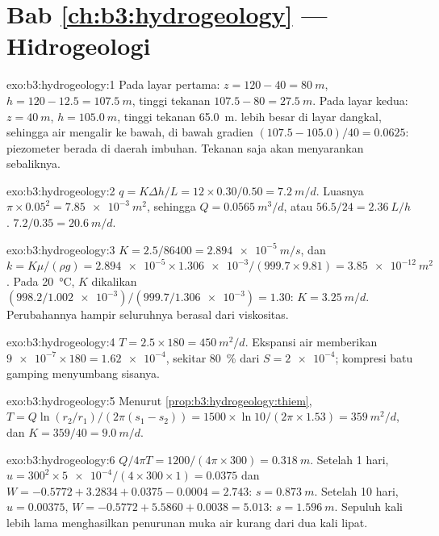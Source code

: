 \section*{Bab \ref{ch:b3:hydrogeology} --- Hidrogeologi}

\begin{solution}{exo:b3:hydrogeology:1}
Pada layar pertama: $z = 120 - 40 = \qty{80}{m}$, $h = 120 - 12.5 =
\qty{107.5}{m}$, tinggi tekanan $107.5 - 80 = \qty{27.5}{m}$. Pada layar
kedua: $z = \qty{40}{m}$, $h = \qty{105.0}{m}$, tinggi tekanan
\qty{65.0}{m}.  lebih besar di layar dangkal, sehingga air
mengalir ke bawah, di bawah gradien $(107.5 - 105.0)/40 = \num{0.0625}$:
piezometer berada di daerah imbuhan. Tekanan saja
akan menyarankan sebaliknya.
\end{solution}

\begin{solution}{exo:b3:hydrogeology:2}
$q = K\Delta h/L = 12\times0.30/0.50 = \qty{7.2}{m/d}$. Luasnya
$\pi\times0.05^2 = \qty{7.85e-3}{m^2}$, sehingga $Q = \qty{0.0565}{m^3/d}$, atau
$56.5/24 = \qty{2.36}{L/h}$.  $7.2/0.35 =
\qty{20.6}{m/d}$.
\end{solution}

\begin{solution}{exo:b3:hydrogeology:3}
$K = 2.5/86400 = \qty{2.894e-5}{m/s}$, dan $k = K\mu/(\rho g) =
\num{2.894e-5}\times\num{1.306e-3}/(999.7\times9.81) =
\qty{3.85e-12}{m^2}$. Pada \qty{20}{\celsius}, $K$ dikalikan
$(998.2/\num{1.002e-3})/(999.7/\num{1.306e-3}) = \num{1.30}$: $K =
\qty{3.25}{m/d}$. Perubahannya hampir seluruhnya berasal dari viskositas.
\end{solution}

\begin{solution}{exo:b3:hydrogeology:4}
$T = 2.5\times180 = \qty{450}{m^2/d}$. Ekspansi air memberikan
$\num{9e-7}\times180 = \num{1.62e-4}$, sekitar \qty{80}{\percent} dari $S =
\num{2e-4}$; kompresi batu gamping menyumbang sisanya.
\end{solution}

\begin{solution}{exo:b3:hydrogeology:5}
Menurut \cref{prop:b3:hydrogeology:thiem}, $T = Q\ln(r_2/r_1)/(2\pi(s_1 -
s_2)) = 1500\times\ln10/(2\pi\times1.53) = \qty{359}{m^2/d}$, dan $K =
359/40 = \qty{9.0}{m/d}$.
\end{solution}

\begin{solution}{exo:b3:hydrogeology:6}
$Q/4\pi T = 1200/(4\pi\times300) = \qty{0.318}{m}$. Setelah 1 hari, $u =
300^2\times\num{5e-4}/(4\times300\times1) = \num{0.0375}$ dan $W = -0.5772
+ 3.2834 + 0.0375 - 0.0004 = \num{2.743}$: $s = \qty{0.873}{m}$. Setelah 10
hari, $u = \num{0.00375}$, $W = -0.5772 + 5.5860 + 0.0038 = \num{5.013}$:
$s = \qty{1.596}{m}$. Sepuluh kali lebih lama menghasilkan
penurunan muka air kurang dari dua kali lipat.
\end{solution}

